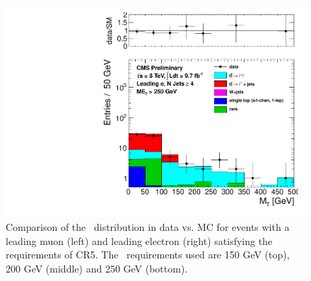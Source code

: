 \begin{figure}[hbt]
\begin{center}
	\includegraphics[width=0.5\linewidth]{plots/CR5plots/mt_met250_leadele_nj4.pdf}
    \caption{
      Comparison of the \mt\ distribution in data vs. MC for events
      with a leading muon (left) and leading electron (right)
      satisfying the requirements of CR5. The \met\ requirements used are
      150 GeV (top), 200 GeV (middle) and 250 GeV (bottom).
\label{fig:cr5mtrest} 
}  
      \end{center}
\end{figure}








